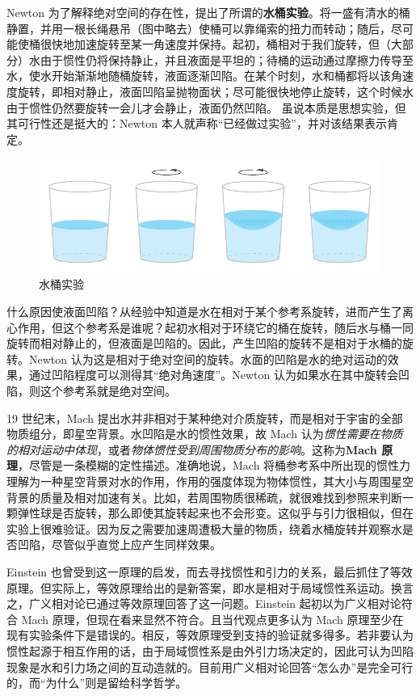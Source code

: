 Newton 为了解释绝对空间的存在性，提出了所谓的\textbf{水桶实验}。将一盛有清水的桶静置，并用一根长绳悬吊（图中略去）使桶可以靠绳索的扭力而转动；随后，尽可能使桶很快地加速旋转至某一角速度并保持。起初，桶相对于我们旋转，但（大部分）水由于惯性仍将保持静止，并且液面是平坦的；待桶的运动通过摩擦力传导至水，使水开始渐渐地随桶旋转，液面逐渐凹陷。在某个时刻，水和桶都将以该角速度旋转，即相对静止，液面凹陷呈抛物面状；尽可能很快地停止旋转，这个时候水由于惯性仍然要旋转一会儿才会静止，液面仍然凹陷。
虽说本质是思想实验，但其可行性还是挺大的：Newton 本人就声称“已经做过实验”，并对该结果表示肯定。
\begin{figure}[ht]\centering
    \includegraphics{fig/chpt01/spinning bucket.pdf}
    \caption{水桶实验}
\end{figure}
什么原因使液面凹陷？从经验中知道是水在相对于某个参考系旋转，进而产生了离心作用，但这个参考系是谁呢？起初水相对于环绕它的桶在旋转，随后水与桶一同旋转而相对静止的，但液面是凹陷的。因此，产生凹陷的旋转不是相对于水桶的旋转。Newton 认为这是相对于绝对空间的旋转。水面的凹陷是水的绝对运动的效果，通过凹陷程度可以测得其“绝对角速度”。Newton 认为如果水在其中旋转会凹陷，则这个参考系就是绝对空间。

19 世纪末，Mach 提出水并非相对于某种绝对介质旋转，而是相对于宇宙的全部物质组分，即星空背景。水凹陷是水的惯性效果，故 Mach 认为\textit{惯性需要在物质的相对运动中体现}，或者\textit{物体惯性受到周围物质分布的影响}。这称为\textbf{Mach 原理}，尽管是一条模糊的定性描述。准确地说，Mach 将桶参考系中所出现的惯性力理解为一种星空背景对水的作用，作用的强度体现为物体惯性，其大小与周围星空背景的质量及相对加速有关。比如，若周围物质很稀疏，就很难找到参照来判断一颗弹性球是否旋转，那么即使其旋转起来也不会形变。这似乎与引力很相似，但在实验上很难验证。因为反之需要加速周遭极大量的物质，绕着水桶旋转并观察水是否凹陷，尽管似乎直觉上应产生同样效果。

Einstein 也曾受到这一原理的启发，而去寻找惯性和引力的关系，最后抓住了等效原理。但实际上，等效原理给出的是新答案，即水是相对于局域惯性系运动。换言之，广义相对论已通过等效原理回答了这一问题。Einstein 起初以为广义相对论符合 Mach 原理，但现在看来显然不符合。且当代观点更多认为 Mach 原理至少在现有实验条件下是错误的。相反，等效原理受到支持的验证就多得多。若非要认为惯性起源于相互作用的话，由于局域惯性系是由外引力场决定的，因此可认为凹陷现象是水和引力场之间的互动造就的。目前用广义相对论回答“怎么办”是完全可行的，而“为什么”则是留给科学哲学。

